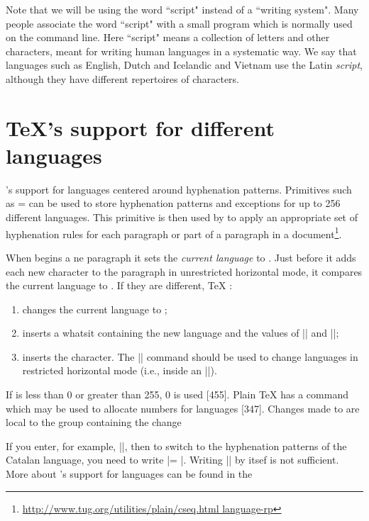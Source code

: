 Note that  we will be using the word ``script" instead of a ``writing system". Many people associate the word ``script" with a small program which is normally used on the command line. Here ``script" means a collection of letters and other characters, meant for writing human languages in a systematic way.  We say that languages such as English, Dutch and Icelandic and Vietnam use the Latin \emph{script}, although they have different repertoires of characters. 


\section{TeX's support for different languages}

\tex's support for languages centered around hyphenation patterns.
Primitives such as = can be used to store hyphenation patterns and exceptions for up to 256 different languages. 
This primitive is then used by \tex to apply an appropriate set of hyphenation rules for each paragraph or part of a paragraph in a document\footnote{\url{http://www.tug.org/utilities/plain/cseq.html language-rp}}. 

When \tex begins a ne paragraph it sets the \emph{current language} to \cmd{\language}. Just before it adds each new character to the paragraph in unrestricted horizontal mode, it compares the current language to \cmd{\language}. If they are different, TeX : 
\begin{enumerate}
\item changes the current language to \cmd{\language}; 

\item inserts a whatsit containing the new language and the values of |\lefthyphenmin| and |\righthyphenmin|; 

\item inserts the character. The |\setlanguage| command should be used to change languages in restricted horizontal mode (i.e., inside an |\hbox|). 
\end{enumerate}
If  is less than 0 or greater than 255, 0 is used [455].
  Plain TeX has a  command which may be used to allocate numbers for languages [347]. Changes made to  are local to the group containing the change 
  
If you enter, for example, |\newlanguage\Catalan|, then to switch to the hyphenation patterns of the Catalan language, you need to write |\language = \Catalan|. Writing |\Catalan| by itsef is not sufficient. 
More about \tex's support for languages can be found in the 

